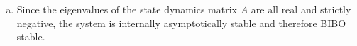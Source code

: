 \documentclass{article}
\begin{document}
\begin{enumerate}[(a)]
{\begin{align*}
\begin{array}{c}
          + \frac{4}{s+4} \\
            \frac{14}{s+1}
          - \frac{34}{s+2}
          + \frac{36}{s+3}
          + \frac{4}{s+4} \\
            \frac{7}{s+1}
          - \frac{11}{s+2}
          - \frac{8}{s+4}
        \end{array}\right]^\top B \\
     &= \frac{19}{s+1} - \frac{54}{s+2} + \frac{62}{s+3} + \frac{12}{s+4}.
   \end{align*}
}
\item
{
  Since the eigenvalues of the state dynamics matrix $A$ are all real
  and strictly negative, the system is internally asymptotically
  stable and therefore BIBO stable.
}
\end{enumerate}
\end{document}
